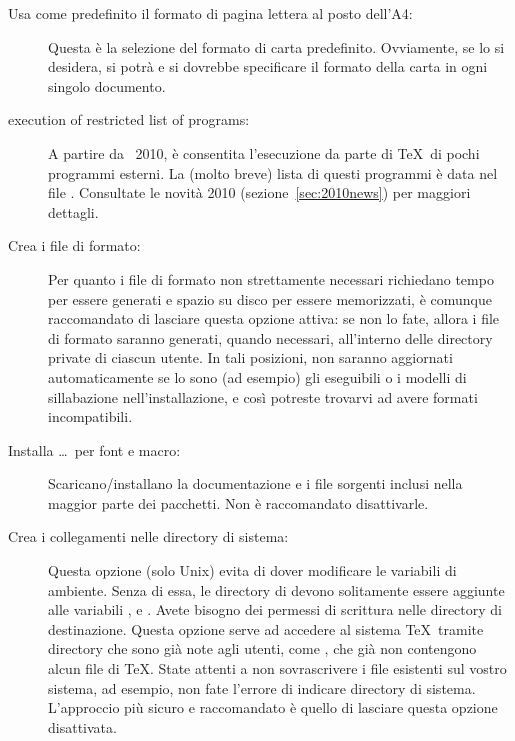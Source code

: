 \documentclass{article}
\begin{document}
\begin{description}
\item[Usa come predefinito il formato di pagina lettera al posto dell'A4:]
  Questa è la selezione del formato di carta predefinito. Ovviamente, se
  lo si desidera, si potrà e si dovrebbe specificare il formato della
  carta in ogni singolo documento.

\item[execution of restricted list of programs:] A partire da \TL\ 2010,
  è consentita l'esecuzione da parte di \TeX\ di pochi programmi esterni.
  La (molto breve) lista di questi programmi è data nel file
  . Consultate le novità 2010
  (sezione~\ref{sec:2010news}) per maggiori dettagli.

\item[Crea i file di formato:] Per quanto i file di formato non
  strettamente necessari richiedano tempo per essere generati e spazio su
  disco per essere memorizzati, è comunque raccomandato di lasciare questa
  opzione attiva: se non lo fate, allora i file di formato saranno
  generati, quando necessari, all'interno delle directory private
   di ciascun utente. In tali posizioni, non saranno
  aggiornati automaticamente se lo sono (ad esempio) gli eseguibili o i
  modelli di sillabazione nell'installazione, e così potreste trovarvi ad
  avere formati incompatibili.

\item[Installa \ldots\ per font e macro:] Scaricano/installano 
  la documentazione e i file sorgenti inclusi nella
  maggior parte dei pacchetti. Non è raccomandato disattivarle.

\item[Crea i collegamenti nelle directory di sistema:] Questa opzione
  (solo Unix) evita di dover modificare le variabili di ambiente.
  Senza di essa, le directory di \TL{} devono solitamente essere aggiunte
  alle variabili ,  e .
  Avete bisogno dei permessi di scrittura nelle directory di destinazione.
  Questa opzione serve ad accedere al sistema \TeX\ tramite directory che
  sono già note agli utenti, come , che già non
  contengono alcun file di \TeX. State attenti a non sovrascrivere i file 
  esistenti sul
  vostro sistema, ad esempio, non fate l'errore di indicare directory di 
  sistema. L'approccio
  più sicuro e raccomandato è quello di lasciare questa opzione
  disattivata.


\end{description}
\end{document}
